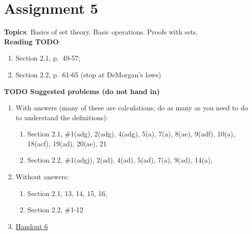 \documentclass[12pt]{article}
\begin{document}
 
\newpage
\section[5 (due \csname dateWeek5\endcsname): Set theory. Basic operations. Proofs with sets.]{Assignment 5}

\textbf{Topics}: Basics of set theory. Basic operations. Proofs with sets.
\\

\noindent \textbf{Reading TODO}:
\begin{enumerate}
\item Section 2.1, p.~49-57; 
\item Section 2.2, p.~61-65 (stop at DeMorgan's laws)
\end{enumerate}




\noindent \textbf{TODO Suggested problems (do not hand in)}


\begin{enumerate}
\item With answers (many of these are calculations; do as many as you need to do to understand the definitions):
 \begin{enumerate}
 \item Section 2.1, \#1(adg), 2(adg), 4(adg), 5(a), 7(a), 8(ae), 9(adf), 10(a), 18(acf), 19(ad), 20(ae), 21
 \item Section 2.2, \#1(adgj), 2(ad), 4(ad), 5(ad), 7(a), 9(ad), 14(a),
\end{enumerate}

\item Without answers:
 \begin{enumerate}
 \item Section 2.1, 13, 14, 15, 16, 
 \item Section 2.2, \#1-12
 \end{enumerate}

\item \href{https://www.math.emory.edu/~dzb/teaching/250Fall2021/handouts/250-H06-sets-I.pdf}{Handout 6}
\end{enumerate}
\end{document}
